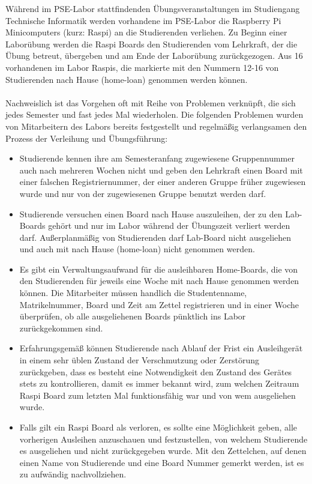Während im PSE-Labor stattfindenden Übungsveranstaltungen im Studiengang Technische Informatik werden vorhandene im PSE-Labor die Raspberry Pi Minicomputers (kurz: Raspi)  an die Studierenden verliehen. Zu Beginn einer Laborübung werden die Raspi Boards den Studierenden vom Lehrkraft, der die Übung betreut, übergeben und am Ende der Laborübung zurückgezogen. Aus 16 vorhandenen im Labor Raspis, die markierte mit den Nummern 12-16 von Studierenden nach Hause (home-loan) genommen werden können.\\\\
Nachweislich ist das Vorgehen oft mit Reihe von Problemen verknüpft, die sich jedes Semester und fast jedes Mal wiederholen. Die folgenden Problemen wurden von Mitarbeitern des Labors bereits festgestellt und regelmäßig verlangsamen den Prozess der Verleihung und Übungsführung: 
\begin{itemize}
	\item Studierende kennen ihre am Semesteranfang zugewiesene Gruppennummer auch nach mehreren Wochen nicht und geben den Lehrkraft einen Board mit einer falschen Registriernummer, der einer anderen Gruppe früher zugewiesen wurde und nur von der zugewiesenen Gruppe benutzt werden darf. 
	\item Studierende versuchen  einen Board nach Hause auszuleihen, der zu den Lab-Boards gehört und nur im Labor während der Übungszeit verliert werden darf. Außerplanmäßig von Studierenden darf Lab-Board nicht ausgeliehen und auch mit nach Hause (home-loan) nicht genommen werden.
	\item Es gibt ein Verwaltungsaufwand für die ausleihbaren Home-Boards, die von den Studierenden für jeweils eine Woche mit nach Hause genommen werden können. Die Mitarbeiter müssen handlich die Studentenname, Matrikelnummer, Board und Zeit am Zettel registrieren und in einer Woche überprüfen, ob alle ausgeliehenen Boards pünktlich ins Labor zurückgekommen sind. 
	\item Erfahrungsgemäß können Studierende nach Ablauf der Frist ein Ausleihgerät in einem sehr üblen Zustand der Verschmutzung oder Zerstörung zurückgeben, dass es besteht eine Notwendigkeit den Zustand des Gerätes stets zu kontrollieren, damit es immer bekannt wird, zum welchen Zeitraum Raspi Board zum letzten Mal funktionsfähig war und von wem ausgeliehen wurde.  
	\item Falls gilt ein Raspi Board als verloren, es sollte eine Möglichkeit geben, alle vorherigen Ausleihen anzuschauen und festzustellen, von welchem Studierende es ausgeliehen und nicht zurückgegeben wurde. Mit den Zettelchen, auf denen einen Name von Studierende und eine Board Nummer gemerkt werden, ist es zu aufwändig nachvollziehen.	
\end{itemize}

